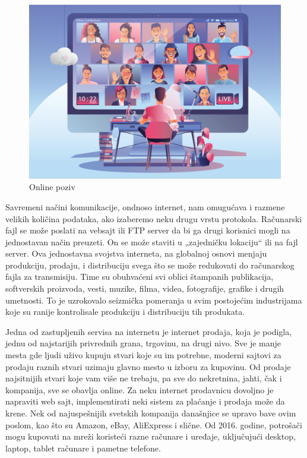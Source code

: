 \documentclass[10pt]{article}
\begin{document}
\begin{figure}
    \centering
    \includegraphics[scale=0.2]{poziv.png}
    \caption{Online poziv}
\end{figure}

	Savremeni načini komunikacije, ondnoso internet, nam omugućava i razmene velikih količina podataka, ako izaberemo neku drugu vrstu protokola. Računarski fajl se može poslati na vebsajt ili FTP server da bi ga drugi korisnici mogli na jednostavan način preuzeti. On se može staviti u „zajedničku lokaciju“ ili na fajl server.  Ova jednostavna svojstva interneta, na globalnoj osnovi menjaju produkciju, prodaju, i distribuciju svega što se može redukovati do računarskog fajla za transmisiju. Time su obuhvaćeni svi oblici štampanih publikacija, softverskih proizvoda, vesti, muzike, filma, videa, fotografije, grafike i drugih umetnosti. To je uzrokovalo seizmička pomeranja u svim postojećim industrijama koje su ranije kontrolisale produkciju i distribuciju tih produkata.

	Jedna od zastupljenih servisa na internetu je internet prodaja, koja je podigla, jednu od najstarijih privrednih grana, trgovinu, na drugi nivo. Sve je manje mesta gde ljudi uživo kupuju stvari koje su im potrebne, moderni sajtovi za prodaju raznih stvari uzimaju glavno mesto u izboru za kupovinu. Od prodaje najsitnijih stvari koje vam više ne trebaju, pa sve do nekretnina, jahti, čak i kompanija, sve se obavlja online. Za neku internet prodavnicu dovoljno je napraviti web sajt, implementirati neki sistem za plaćanje i prodaja može da krene. Nek od najuspešnijih svetskih kompanija današnjice se upravo bave ovim poslom, kao što su Amazon, eBay, AliExpress i slične. Od 2016. godine, potrošači mogu kupovati na mreži koristeći razne računare i uređaje, uključujući desktop, laptop, tablet računare i pametne telefone.
\end{document}
